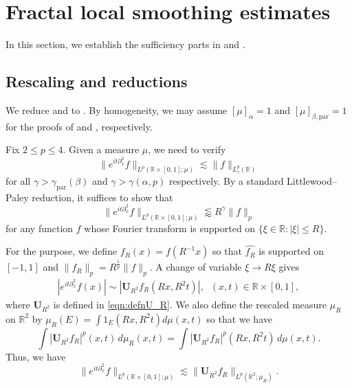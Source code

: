 \documentclass[11pt]{amsart}
\theoremstyle{definition}
\theoremstyle{remark}
\renewcommand{\hat}{\widehat}
\newcommand{\R}{\mathbb{R}}
\newcommand{\bU}{\mathbf{U}}
\newcommand{\les}{\lesssim}
\newcommand{\less}{\lessapprox}
\begin{document}
\section{Fractal local smoothing estimates}\label{sec:ls}
In this section, we establish the sufficiency parts in  and . 
\subsection{Rescaling and reductions}\label{sec:rescale}
We reduce  and  to . By homogeneity, we may assume $[\mu]_{\alpha} = 1$ and $[\mu]_{\beta,\text{par}} = 1$ for the proofs of  and , respectively. 

Fix $2\leq p \leq 4$. Given a measure $\mu$, we need to verify
\[
	\big\| e^{it\partial_x^2}f  \big\|_{L^p(\R\times[0,1];\mu)}
	\les  \|f\|_{L^p_\gamma(\R)}
\]
for all $\gamma>\gamma_{\text{par}}(\beta)$ and $\gamma>\gamma(\alpha,p)$ respectively.  By a standard Littlewood--Paley reduction, it suffices to show that 
\[ 
\| e^{it\partial_x^2}f \|_{L^p(\R\times[0,1];\mu)}
\less R^{\gamma} \|f\|_p
\]
for any function $f$ whose Fourier transform is supported on  $\{\xi\in\R: |\xi| \le R\}$.


For the purpose, we define $f_R(x) = f(R^{-1}x)$ so that $\hat{f_R}$ is supported on $[-1,1]$ and $\| f_R \|_p = R^{\frac1p}\|f\|_p$.  A change of variable $\xi\rightarrow R\xi$ gives
\begin{align*}
	|e^{it\partial_x^2}f(x)| \sim |\mathbf{U}_{R^2} f_R (Rx, R^2 t)| , \;\; (x,t) \in \R \times [0,1],
\end{align*}
where $\mathbf{U}_{R^2}$ is defined in  \eqref{eqn:defnU_R}. 
We also define the rescaled measure $\mu_R$ on $\R^2$ by $\mu_R(E) = \int 1_E(Rx,R^2 t) d\mu(x,t)$ so that we have  
\[
	\int |\mathbf{U}_{R^2} f_R|^p(x,t)\,d\mu_R(x,t) = \int |\mathbf{U}_{R^2} f_R|^p (Rx, R^2 t)\,d\mu(x,t).
\]
Thus, we have 
\begin{equation}\label{eqn:reductionFLS}
    \big\| e^{it\partial_x^2}f \big\|_{L^p(\R\times[0,1];\mu)}
\les \big\| \bU_{R^2} f_R \big\|_{L^p(\R^2; \mu_R)}.
\end{equation}
\end{document}
